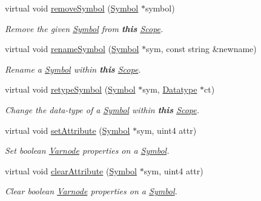 \begin{DoxyCompactItemize}
virtual void \mbox{\hyperlink{class_scope_internal_a77c1ceb048a903b047c1e52108890979}{remove\+Symbol}} (\mbox{\hyperlink{class_symbol}{Symbol}} $\ast$symbol)
\begin{DoxyCompactList}\small\item\em Remove the given \mbox{\hyperlink{class_symbol}{Symbol}} from {\bfseries{this}} \mbox{\hyperlink{class_scope}{Scope}}. \end{DoxyCompactList}\item 
virtual void \mbox{\hyperlink{class_scope_internal_ada63ff8f4efed6fd4605441a0150ae6f}{rename\+Symbol}} (\mbox{\hyperlink{class_symbol}{Symbol}} $\ast$sym, const string \&newname)
\begin{DoxyCompactList}\small\item\em Rename a \mbox{\hyperlink{class_symbol}{Symbol}} within {\bfseries{this}} \mbox{\hyperlink{class_scope}{Scope}}. \end{DoxyCompactList}\item 
virtual void \mbox{\hyperlink{class_scope_internal_a9711a8084e1ac5c4417a4452c96a36b7}{retype\+Symbol}} (\mbox{\hyperlink{class_symbol}{Symbol}} $\ast$sym, \mbox{\hyperlink{class_datatype}{Datatype}} $\ast$ct)
\begin{DoxyCompactList}\small\item\em Change the data-\/type of a \mbox{\hyperlink{class_symbol}{Symbol}} within {\bfseries{this}} \mbox{\hyperlink{class_scope}{Scope}}. \end{DoxyCompactList}\item 
virtual void \mbox{\hyperlink{class_scope_internal_a320fb817d3062994cb994e38a45fc0e1}{set\+Attribute}} (\mbox{\hyperlink{class_symbol}{Symbol}} $\ast$sym, uint4 attr)
\begin{DoxyCompactList}\small\item\em Set boolean \mbox{\hyperlink{class_varnode}{Varnode}} properties on a \mbox{\hyperlink{class_symbol}{Symbol}}. \end{DoxyCompactList}\item 
virtual void \mbox{\hyperlink{class_scope_internal_a8c42cfc4ea5d359bd11d1251ef8d21d7}{clear\+Attribute}} (\mbox{\hyperlink{class_symbol}{Symbol}} $\ast$sym, uint4 attr)
\begin{DoxyCompactList}\small\item\em Clear boolean \mbox{\hyperlink{class_varnode}{Varnode}} properties on a \mbox{\hyperlink{class_symbol}{Symbol}}. \end{DoxyCompactList}\item 

\end{DoxyCompactItemize}
